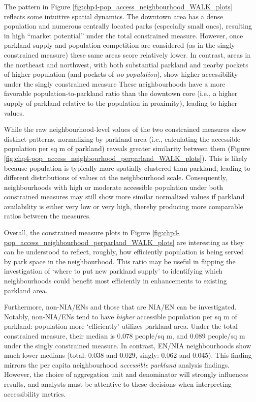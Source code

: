 \documentclass[
11pt, %
oneside, %
english, %
singlespacing, %
]{macthesis} %
\begin{document}
The pattern in Figure \ref{fig:chp4-pop_access_neighbourhood_WALK_plots} reflects some intuitive spatial dynamics. The downtown area has a dense population and numerous centrally located parks (especially small ones), resulting in high ``market potential'' under the total constrained measure. However, once parkland supply and population competition are considered (as in the singly constrained measure) these same areas score relatively lower. In contrast, areas in the northeast and northwest, with both substantial parkland and nearby pockets of higher population (and pockets of \emph{no population}), show higher accessibility under the singly constrained measure These neighbourhoods have a more favorable population-to-parkland ratio than the downtown core (i.e., a higher supply of parkland relative to the population in proximity), leading to higher values.

While the raw neighbourhood-level values of the two constrained measures show distinct patterns, normalizing by parkland area (i.e., calculating the accessible population per sq m of parkland) reveals greater similarity between them (Figure \ref{fig:chp4-pop_access_neighbourhood_perparland_WALK_plots}). This is likely because population is typically more spatially clustered than parkland, leading to different distributions of values at the neighbourhood scale. Consequently, neighbourhoods with high or moderate accessible population under both constrained measures may still show more similar normalized values if parkland availability is either very low or very high, thereby producing more comparable ratios between the measures.

Overall, the constrained measure plots in Figure \ref{fig:chp4-pop_access_neighbourhood_perparland_WALK_plots} are interesting as they can be understood to reflect, roughly, how efficiently population is being served by park space in the neighbourhood. This ratio may be useful in flipping the investigation of `where to put new parkland supply' to identifying which neighbourhoods could benefit most efficiently in enhancements to existing parkland area.

Furthermore, non-NIA/ENs and those that are NIA/EN can be investigated. Notably, non-NIA/ENs tend to have \emph{higher} accessible population per sq m of parkland: population more `efficiently' utilizes parkland area. Under the total constrained measure, their median is 0.078 people/sq m, and 0.089 people/sq m under the singly constrained measure. In contrast, EN/NIA neighbourhoods show much lower medians (total: 0.038 and 0.029, singly: 0.062 and 0.045). This finding mirrors the per capita neighbourhood \emph{accessible parkland} analysis findings. However, the choice of aggregation unit and denominator will strongly influences results, and analysts must be attentive to these decisions when interpreting accessibility metrics.
\end{document}
